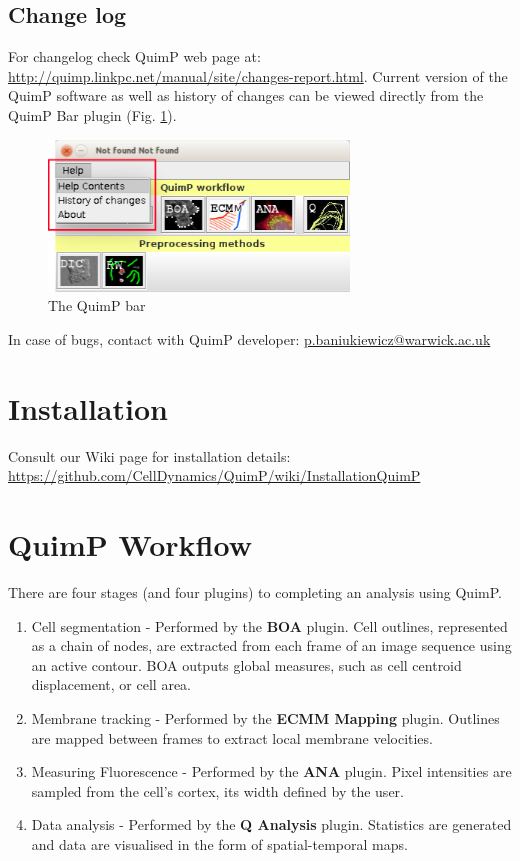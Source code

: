 \documentclass[a4paper,12pt]{article}
\begin{document}
\subsection{Change log}
For changelog check QuimP web page at: \url{http://quimp.linkpc.net/manual/site/changes-report.html}.
Current version of the QuimP software as well as history of changes can be viewed directly from the QuimP Bar plugin (Fig. \ref{fig:quimpBar_menu}).
\begin{figure}[ht]
	\centering
	\includegraphics[width=8cm]{quimpBar_menu.png} %
	\caption{The QuimP bar}
	\label{fig:quimpBar_menu}
\end{figure}
 	
In case of bugs, contact with QuimP developer: \href{mailto:p.baniukiewicz@warwick.ac.uk}{p.baniukiewicz@warwick.ac.uk}

\section{Installation}

Consult our Wiki page for installation details: \url{https://github.com/CellDynamics/QuimP/wiki/InstallationQuimP}


\section{QuimP Workflow}

There are four stages (and four plugins) to completing an analysis using QuimP.

\begin{enumerate}
	\item Cell segmentation - Performed by the \textbf{BOA} plugin.  Cell outlines, represented as a chain of nodes, are extracted from each frame of an image sequence using an active contour. BOA outputs global measures, such as cell centroid displacement, or cell area.
	\item Membrane tracking - Performed by the \textbf{ECMM Mapping} plugin.  Outlines are mapped between frames to extract local membrane velocities.
	\item Measuring Fluorescence - Performed by the \textbf{ANA} plugin.  Pixel intensities are sampled from the cell's cortex, its width defined by the user.
	\item Data analysis - Performed by the \textbf{Q Analysis} plugin. Statistics are generated and data are visualised in the form of spatial-temporal maps.
\end{enumerate}
\end{document}
